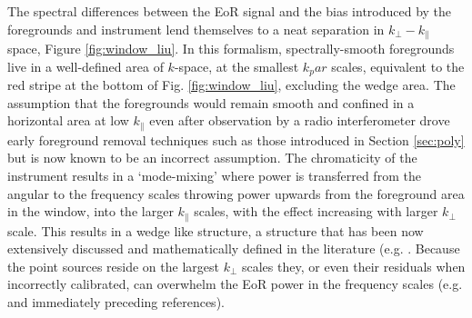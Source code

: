 The spectral differences between the EoR signal and the bias introduced by the foregrounds and instrument lend themselves to a neat separation in $k_\bot-k_\parallel$ space, Figure \ref{fig:window_liu}. In this formalism, spectrally-smooth foregrounds live in a well-defined area of $k$-space, at the smallest $k_par$ scales, equivalent to the red stripe at the bottom of Fig. \ref{fig:window_liu}, excluding the wedge area. The assumption that the foregrounds would remain smooth and confined in a horizontal area at low $k_\parallel$ even after observation by a radio interferometer drove early foreground removal techniques such as those introduced in Section \ref{sec:poly} but is now known to be an incorrect assumption. The chromaticity of the instrument results in a `mode-mixing' where power is transferred from the angular to the frequency scales throwing power upwards from the foreground area in the window, into the larger $k_\parallel$ scales, with the effect increasing with larger $k_\bot$ scale. This results in a wedge like structure, a structure that has been now extensively discussed and mathematically defined in the literature (e.g. \citep{Dillon2014PhRvD..89b3002D,Liu2014PhRvD..90b3019L,Liu2014PhRvD..90b3018L,Hazelton2013ApJ...770..156H,Thyagarajan2013ApJ...776....6T,Pober2013ApJ...768L..36P,Morales2012ApJ...752..137M,Vedantham2012ApJ...745..176V,Trott2012ApJ...757..101T,Parsons2012ApJ...756..165P,Datta2010ApJ...724..526D}. Because the point sources reside on the largest $k_\bot$ scales they, or even their residuals when incorrectly calibrated, can overwhelm the EoR power in the frequency scales (e.g. \citep{Bowman2009ApJ...695..183B} and immediately preceding references).

